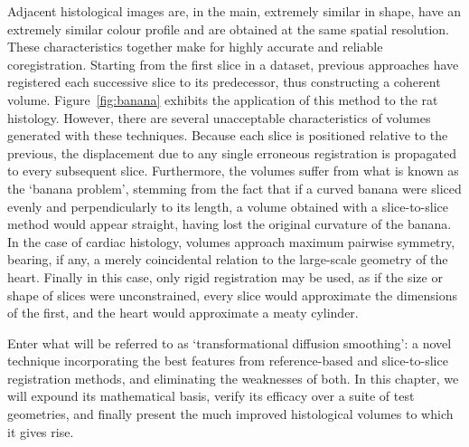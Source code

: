  Adjacent histological images are, in the main, extremely similar in shape, have an extremely similar colour profile and are obtained at the same spatial resolution. These characteristics together make for highly accurate and reliable coregistration. Starting from the first slice in a dataset, previous approaches have registered each successive slice to its predecessor, thus constructing a coherent volume. Figure~\ref{fig:banana} exhibits the application of this method to the rat histology. However, there are several unacceptable characteristics of volumes generated with these techniques. Because each slice is positioned relative to the previous, the displacement due to any single erroneous registration is propagated to every subsequent slice. Furthermore, the volumes suffer from what is known as the `banana problem', stemming from the fact that if a curved banana were sliced evenly and perpendicularly to its length, a volume obtained with a slice-to-slice method would appear straight, having lost the original curvature of the banana. In the case of cardiac histology, volumes approach maximum pairwise symmetry, bearing, if any, a merely coincidental relation to the large-scale geometry of the heart. Finally in this case, only rigid registration may be used, as if the size or shape of slices were unconstrained, every slice would approximate the dimensions of the first, and the heart would approximate a meaty cylinder.
  
  Enter what will be referred to as `transformational diffusion smoothing': a novel technique incorporating the best features from reference-based and slice-to-slice registration methods, and eliminating the weaknesses of both. In this chapter, we will expound its mathematical basis, verify its efficacy over a suite of test geometries, and finally present the much improved histological volumes to which it gives rise.
  
  

  
